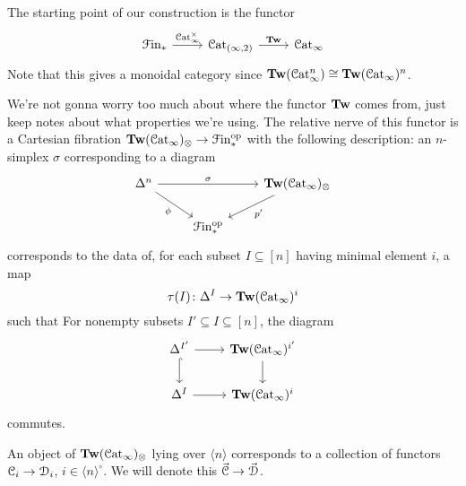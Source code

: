 \documentclass[main.tex]{subfiles}
\begin{document}
The starting point of our construction is the functor
\begin{equation*}
  \begin{tikzcd}
    \Finp
    \arrow[r, "\ICat^{\times}"]
    & \Cat_{(\infty, 2)}
    \arrow[r, "\Tw"]
    & \ICat
  \end{tikzcd}
\end{equation*}
Note that this gives a monoidal category since $\mathbf{Tw}(\mathcal{C}\mathrm{at}_{\infty}^{n})\cong \mathbf{Tw}(\mathcal{C}\mathrm{at}_{\infty})^{n}$.

We're not gonna worry too much about where the functor $\mathbf{Tw}$ comes from, just keep notes about what properties we're using. The relative nerve of this functor is a Cartesian fibration $\mathbf{Tw}(\mathcal{C}\mathrm{at}_{\infty})_{\otimes} \to \mathcal{F}\mathrm{in}_{*}^{\mathrm{op}}$ with the following description: an $n$-simplex $\sigma$ corresponding to a diagram
\begin{equation*}
  \begin{tikzcd}
    \Delta^{n}
    \arrow[rr, "\sigma"]
    \arrow[dr, swap, "\phi"]
    && \Tw(\ICat)_{\otimes}
    \arrow[dl, "p'"]
    \\
    & \Finp\op
  \end{tikzcd}
\end{equation*}
corresponds to the data of, for each subset $I \subseteq [n]$ having minimal element $i$, a map
\begin{equation*}
  \tau(I)\colon \Delta^{I} \to \mathbf{Tw}(\mathcal{C}\mathrm{at}_{\infty})^{i}
\end{equation*}
such that For nonempty subsets $I' \subseteq I \subseteq [n]$, the diagram
\begin{equation*}
  \begin{tikzcd}
    \Delta^{I'}
    \arrow[r]
    \arrow[d, hook]
    & \Tw(\ICat)^{i'}
    \arrow[d]
    \\
    \Delta^{I}
    \arrow[r]
    & \Tw(\ICat)^{i}
  \end{tikzcd}
\end{equation*}
commutes.

\begin{example}
  An object of $\mathbf{Tw}(\mathcal{C}\mathrm{at}_{\infty})_{\otimes}$ lying over $\langle n \rangle$ corresponds to a collection of functors $\mathcal{C}_{i} \to \mathcal{D}_{i}$, $i \in \langle n \rangle^{\circ}$. We will denote this $\vec{\mathcal{C}} \to \vec{\mathcal{D}}$.
\end{example}
\end{document}
